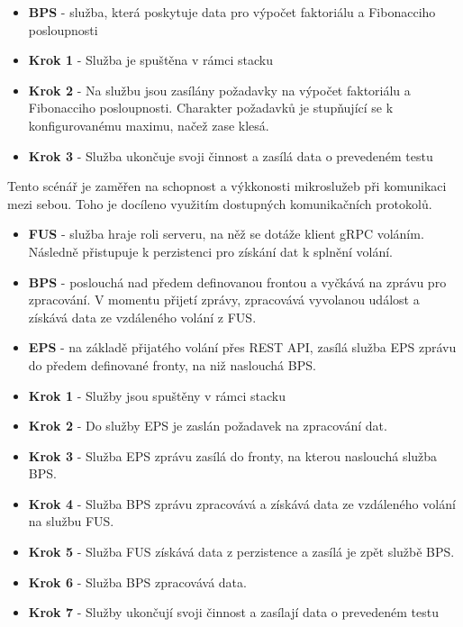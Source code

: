 
\begin{itemize}
    \item \textbf{BPS} - služba, která poskytuje data pro výpočet faktoriálu a Fibonacciho posloupnosti
\end{itemize}


\begin{itemize}
    \item \textbf{Krok 1} - Služba je spuštěna v rámci stacku
    \item \textbf{Krok 2} - Na službu jsou zasílány požadavky na výpočet faktoriálu a Fibonacciho posloupnosti. Charakter požadavků je stupňující se k konfigurovanému maximu, načež zase klesá.
    \item \textbf{Krok 3} - Služba ukončuje svoji činnost a zasílá data o prevedeném testu
    
\end{itemize}


Tento scénář je zaměřen na schopnost a výkkonosti mikroslužeb při komunikaci mezi sebou. Toho je docíleno využitím dostupných komunikačních protokolů.


\begin{itemize}
    \item \textbf{FUS} - služba hraje roli serveru, na něž se dotáže klient gRPC voláním. Následně přistupuje k perzistenci pro získání dat k splnění volání.
    \item \textbf{BPS} - poslouchá nad předem definovanou frontou a vyčkává na zprávu pro zpracování. V momentu přijetí zprávy, zpracovává vyvolanou událost a získává data ze vzdáleného volání z FUS.
    \item \textbf{EPS} - na základě přijatého volání přes REST API, zasílá služba EPS zprávu do předem definované fronty, na niž naslouchá BPS.
\end{itemize}


\begin{itemize}
    \item \textbf{Krok 1} - Služby jsou spuštěny v rámci stacku
    \item \textbf{Krok 2} - Do služby EPS je zaslán požadavek na zpracování dat. 
    \item \textbf{Krok 3} - Služba EPS zprávu zasílá do fronty, na kterou naslouchá služba BPS. 
    \item \textbf{Krok 4} - Služba BPS zprávu zpracovává a získává data ze vzdáleného volání na službu FUS. 
    \item \textbf{Krok 5} - Služba FUS získává data z perzistence a zasílá je zpět službě BPS. 
    \item \textbf{Krok 6} - Služba BPS zpracovává data.
    \item \textbf{Krok 7} - Služby ukončují svoji činnost a zasílají data o prevedeném testu
\end{itemize}

